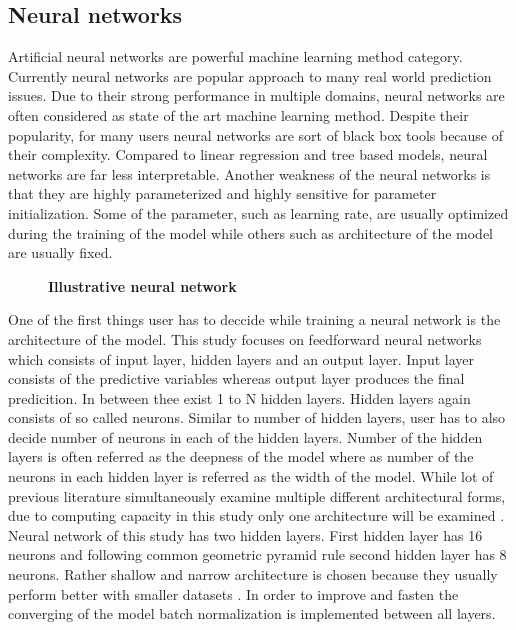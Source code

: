 \documentclass{article}
\begin{document}
\subsection{Neural networks}

Artificial neural networks are powerful machine learning method category. Currently neural networks are popular approach to many real world prediction issues. Due to their strong performance in multiple domains, neural networks are often considered as state of the art machine learning method. Despite their popularity, for many users neural networks are sort of black box tools because of their complexity. Compared to linear regression and tree based models, neural networks are far less interpretable. Another weakness of the neural networks is that they are highly parameterized and highly sensitive for parameter initialization. Some of the parameter, such as learning rate, are usually optimized during the training of the model while others such as architecture of the model are usually fixed. 

\begin{figure}
\centering
\caption[Illustrative neural network]{\textbf{Illustrative neural network}\\  }

\label{plot:NN}
\end{figure}

One of the first things user has to deccide while training a neural network is the architecture of the model. This study focuses on feedforward neural networks which consists of input layer, hidden layers and an output layer. Input layer consists of the predictive variables whereas output layer produces the final predicition. In between thee exist 1 to N hidden layers. Hidden layers again consists of  so called neurons. Similar to number of hidden layers, user has to also decide number of neurons in each of the hidden layers. Number of the hidden layers is often referred as the deepness of the model where as number of the neurons in each hidden layer is referred as the width of the model. While lot of previous literature simultaneously examine multiple different architectural forms, due to computing capacity in this study only one architecture will be examined \cite{guetal, HANAUER2022, TOBEK2021100588}. Neural network of this study has two hidden layers. First hidden layer has 16 neurons and following common geometric pyramid rule second hidden layer has 8 neurons. Rather shallow and narrow architecture is chosen because they usually perform better with smaller datasets \cite{guetal}. In order to improve and fasten the converging of the model batch normalization is implemented between all layers.
\end{document}
